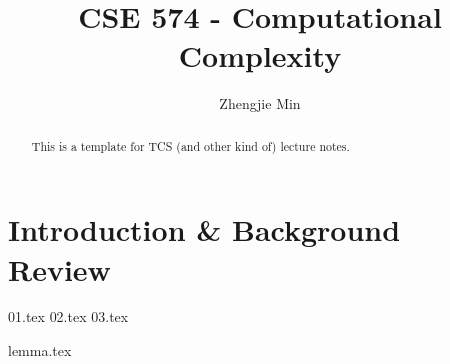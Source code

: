 \documentclass[a4paper]{report}
\author{Zhengjie Min}
\title{CSE 574 - Computational Complexity}
\begin{document}
\maketitle

\begin{abstract}
	This is a template for TCS (and other kind of) lecture notes.
\end{abstract}

\newpage

\tableofcontents

\part{Introduction \& Background Review}

{01.tex}
{02.tex}
{03.tex}

\newpage
\appendix
\appendixpage{}

{lemma.tex}
%

\newpage
\pagestyle{plain}
\printbibliography{}
\end{document}
